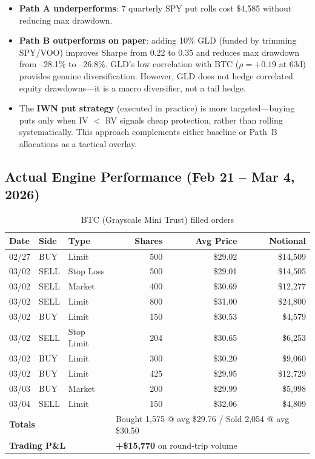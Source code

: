 \documentclass[11pt,letterpaper]{article}
\begin{document}
\begin{itemize}[nosep]
  \item \textbf{Path A underperforms}: 7 quarterly SPY put rolls cost
        \$4,585 without reducing max drawdown.
  \item \textbf{Path B outperforms on paper}: adding 10\% GLD (funded by
        trimming SPY/VOO) improves Sharpe from 0.22 to 0.35 and reduces
        max drawdown from --28.1\% to --26.8\%. GLD's low correlation
        with BTC ($\rho = +0.19$ at 63d) provides genuine diversification.
        However, GLD does not hedge correlated equity drawdowns---it is a
        macro diversifier, not a tail hedge.
  \item The \textbf{IWN put strategy} (executed in practice) is more
        targeted---buying puts only when IV $<$ RV signals cheap
        protection, rather than rolling systematically. This approach
        complements either baseline or Path~B allocations as a tactical
        overlay.
\end{itemize}

\subsection{Actual Engine Performance (Feb 21 -- Mar 4, 2026)}

\begin{table}[H]
\centering
\caption{BTC (Grayscale Mini Trust) filled orders}
{\small
\begin{tabular*}{\textwidth}{@{\extracolsep{\fill}}lll r r r}
\toprule
Date & Side & Type & Shares & Avg Price & Notional \\
\midrule
02/27 & BUY  & Limit      & 500   & \$29.02 & \$14,509 \\
03/02 & SELL & Stop Loss  & 500   & \$29.01 & \$14,505 \\
03/02 & SELL & Market     & 400   & \$30.69 & \$12,277 \\
03/02 & SELL & Limit      & 800   & \$31.00 & \$24,800 \\
03/02 & BUY  & Limit      & 150   & \$30.53 & \$4,579 \\
03/02 & SELL & Stop Limit & 204   & \$30.65 & \$6,253 \\
03/02 & BUY  & Limit      & 300   & \$30.20 & \$9,060 \\
03/02 & BUY  & Limit      & 425   & \$29.95 & \$12,729 \\
03/03 & BUY  & Market     & 200   & \$29.99 & \$5,998 \\
03/04 & SELL & Limit      & 150   & \$32.06 & \$4,809 \\
\midrule
\multicolumn{3}{l}{\textbf{Totals}} & \multicolumn{3}{l}{Bought 1,575 @ avg \$29.76 / Sold 2,054 @ avg \$30.50} \\
\multicolumn{3}{l}{\textbf{Trading P\&L}} & \multicolumn{3}{l}{\textcolor{gain}{\textbf{+\$15,770}} on round-trip volume} \\
\bottomrule
\end{tabular*}}
\end{table}
\end{document}
